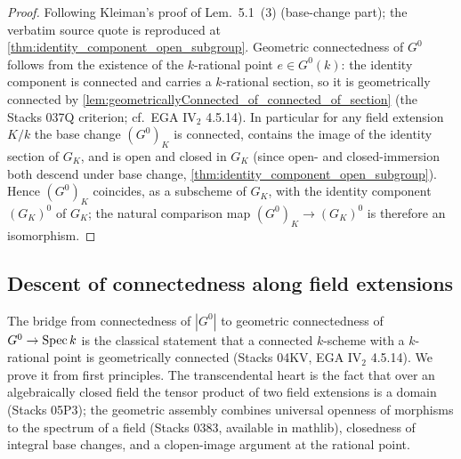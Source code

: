 \begin{proof}
  \leanok
  Following Kleiman's proof of Lem.~5.1~(3) (base-change part); the
  verbatim source quote is reproduced at
  \cref{thm:identity_component_open_subgroup}.
  Geometric connectedness of \(G^0\) follows from the existence of the
  \(k\)-rational point \(e \in G^0(k)\): the identity component is
  connected and carries a \(k\)-rational section, so it is geometrically
  connected by
  \cref{lem:geometricallyConnected_of_connected_of_section} (the
  Stacks 037Q criterion; cf.\ EGA IV\(_2\) 4.5.14). In particular for
  any field extension \(K/k\) the base change \((G^0)_K\) is connected,
  contains the image of the identity section of \(G_K\), and is open and
  closed in \(G_K\) (since open- and closed-immersion both descend under
  base change, \cref{thm:identity_component_open_subgroup}). Hence
  \((G^0)_K\) coincides, as a subscheme of \(G_K\), with the identity
  component \((G_K)^0\) of \(G_K\); the natural comparison map
  \((G^0)_K \to (G_K)^0\) is therefore an isomorphism.
\end{proof}

\subsection{Descent of connectedness along field extensions}
\label{subsec:connectedness_descent}

The bridge from connectedness of \(|G^0|\) to geometric connectedness of
\(G^0 \to \operatorname{Spec} k\) is the classical statement that a connected
\(k\)-scheme with a \(k\)-rational point is geometrically connected
(Stacks 04KV, EGA IV\(_2\) 4.5.14). We prove it from first principles.
The transcendental heart is the fact that over an algebraically closed
field the tensor product of two field extensions is a domain
(Stacks 05P3); the geometric assembly combines universal openness of
morphisms to the spectrum of a field (Stacks 0383, available in
mathlib), closedness of integral base changes, and a clopen-image
argument at the rational point.

